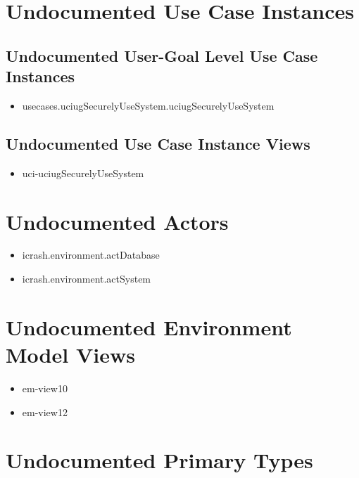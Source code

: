 \section[Undocumented Use Case Instances]{Undocumented Use Case Instances}


\subsection[Undocumented Use Case Instances - User-Goal Level]{Undocumented User-Goal Level Use Case Instances}
\begin{itemize}
\item usecases.uciugSecurelyUseSystem.uciugSecurelyUseSystem 
\end{itemize}


\subsection[Undocumented Use Case Instance Views]{Undocumented Use Case Instance Views}
\begin{itemize}
\item uci-uciugSecurelyUseSystem 
\end{itemize}


\section[Undocumented Actors]{Undocumented Actors}
\begin{itemize}
\item icrash.environment.actDatabase 
\item icrash.environment.actSystem 
\end{itemize}


\section[Undocumented Environment Model Views]{Undocumented Environment Model Views}
\begin{itemize}
\item em-view10 
\item em-view12 
\end{itemize}


\section[Undocumented Primary Types]{Undocumented Primary Types}

